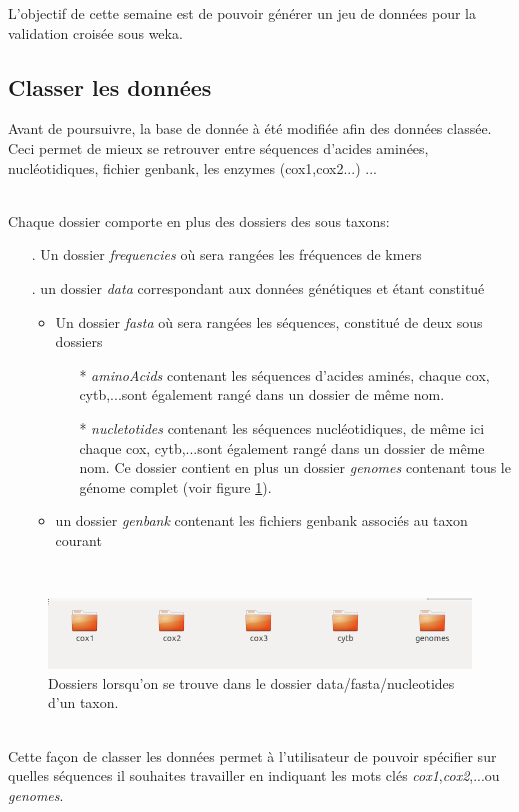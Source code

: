 L'objectif de cette semaine est de pouvoir générer un jeu de données pour la validation croisée sous weka.

\subsection{Classer les données}

Avant de poursuivre, la base de donnée à été modifiée afin des données classée. Ceci permet de mieux se retrouver entre séquences d'acides aminées, nucléotidiques, fichier genbank, les enzymes (cox1,cox2...) ...

~\\
Chaque dossier comporte en plus des dossiers des sous taxons:

\begin{itemize}
 \item[.]Un dossier \textit{frequencies} où sera rangées les fréquences de kmers
  \item[.]un dossier \textit{data} correspondant aux données génétiques et étant constitué
  \begin{itemize}
 \item Un dossier \textit{fasta} où sera rangées les séquences, constitué de deux sous dossiers 
  \begin{itemize}
 \item[*]\textit{aminoAcids} contenant les séquences d'acides aminés, chaque cox, cytb,...sont également rangé dans un dossier de même nom. 
 
  \item[*]\textit{nucletotides} contenant les séquences nucléotidiques, de même ici chaque cox, cytb,...sont également rangé dans un dossier de même nom. Ce dossier contient en plus un dossier \textit{genomes} contenant tous le génome complet (voir figure \ref{dossierCox}).
  
\end{itemize}
  \item un dossier \textit{genbank} contenant les fichiers genbank associés au taxon courant
  
\end{itemize}
\end{itemize}
~\\

\begin{figure}[H]
\begin{center}
\includegraphics[scale=0.5]{./../img/dossier.png}
\caption{\label{dossierCox} Dossiers lorsqu'on se trouve dans le dossier data/fasta/nucleotides d'un taxon.}
\end{center}
\end{figure}
~\\

Cette façon de classer les données permet à l'utilisateur de pouvoir spécifier sur quelles séquences il souhaites travailler en indiquant les mots clés \textit{cox1},\textit{cox2},...ou \textit{genomes}.

